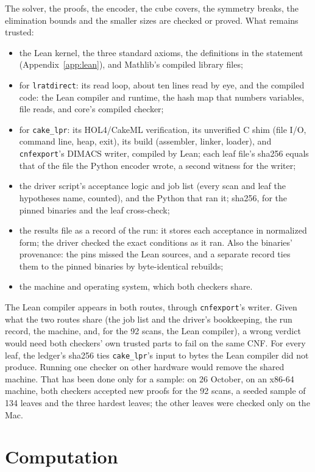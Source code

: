 \documentclass[11pt]{article}
\newcommand{\lean}[1]{\texttt{#1}}
\begin{document}
The solver, the proofs, the encoder, the cube covers, the symmetry breaks, the elimination bounds and the
smaller sizes are checked or proved. What remains trusted:
\begin{itemize}
\item the Lean kernel, the three standard axioms, the definitions in the statement (Appendix~\ref{app:lean}), and
  Mathlib's compiled library files;
\item for \lean{lratdirect}: its read loop, about ten lines read by eye, and the compiled code: the Lean compiler
  and runtime, the hash map that numbers variables, file reads, and core's compiled checker;
\item for \lean{cake\_lpr}: its HOL4/CakeML verification, its unverified C shim (file I/O, command line, heap,
  exit), its build (assembler,
  linker, loader), and \lean{cnfexport}'s DIMACS writer, compiled by Lean; each leaf file's sha256 equals that
  of the file the Python encoder wrote, a second witness for the writer;
\item the driver script's acceptance logic and job list (every scan and leaf the hypotheses name, counted), and
  the Python that ran it; sha256, for the pinned binaries and the leaf cross-check;
\item the results file as a record of the run: it stores each acceptance in normalized form; the driver checked the exact
  conditions as it ran. Also the binaries' provenance: the pins missed the Lean
  sources, and a separate record ties them to the pinned binaries by byte-identical rebuilds;
\item the machine and operating system, which both checkers share.
\end{itemize}
The Lean compiler appears in both routes, through \lean{cnfexport}'s writer. Given what the two routes share
(the job list and the driver's bookkeeping, the run record, the machine, and, for the 92 scans, the Lean
compiler), a wrong verdict would need both checkers' own trusted parts to fail on the same CNF. For every
leaf, the ledger's sha256 ties \lean{cake\_lpr}'s input to bytes the Lean compiler did not produce.
Running one checker on other hardware would remove the shared machine. That has been done only for a
sample: on 26 October, on an x86-64 machine, both checkers accepted new proofs for the 92 scans, a seeded
sample of 134 leaves and the three hardest leaves; the other leaves were checked only on the Mac.

\section{Computation}\label{sec:computation}
\end{document}
